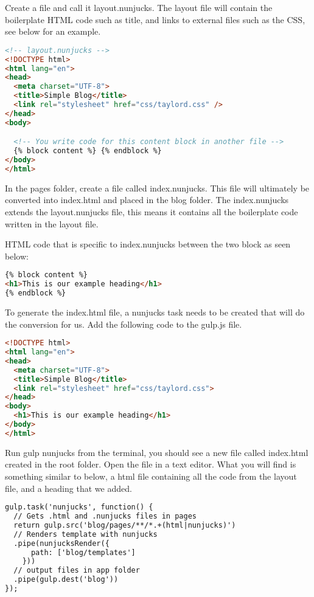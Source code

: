 Create a file and call it layout.nunjucks. The layout file will contain the boilerplate HTML code such as title, and links to external files such as the CSS, see below for an example.

\begin{lstlisting}[language=HTML]
<!-- layout.nunjucks -->
<!DOCTYPE html>
<html lang="en">
<head>
  <meta charset="UTF-8">
  <title>Simple Blog</title>
  <link rel="stylesheet" href="css/taylord.css" />
</head>
<body>

  <!-- You write code for this content block in another file -->
  {% block content %} {% endblock %}
</body>
</html>
\end{lstlisting}

In the pages folder, create a file called index.nunjucks. This file will ultimately be converted into index.html and placed in the blog folder. The index.nunjucks extends the layout.nunjucks file, this means it contains all the boilerplate code written in the layout file. 

HTML code that is specific to index.nunjucks between the two block as seen below: 

\begin{lstlisting}[language=HTML]
{% block content %}
<h1>This is our example heading</h1>
{% endblock %}
\end{lstlisting}

To generate the index.html file, a nunjucks task needs to be created that will do the conversion for us. Add the following code to the gulp.js file.  

\begin{lstlisting}[language=HTML]
<!DOCTYPE html>
<html lang="en">
<head>
  <meta charset="UTF-8">
  <title>Simple Blog</title>
  <link rel="stylesheet" href="css/taylord.css">
</head>
<body>
  <h1>This is our example heading</h1>
</body>
</html>
\end{lstlisting}

Run gulp nunjucks from the terminal, you should see a new file called index.html created in the root folder. Open the file in a text editor. What you will find is something similar to below, a html file containing all the code from the layout file, and a heading that we added. 

\begin{lstlisting}[language=HTML]
gulp.task('nunjucks', function() {
  // Gets .html and .nunjucks files in pages
  return gulp.src('blog/pages/**/*.+(html|nunjucks)')
  // Renders template with nunjucks
  .pipe(nunjucksRender({
      path: ['blog/templates']
    }))
  // output files in app folder
  .pipe(gulp.dest('blog'))
});
\end{lstlisting}

